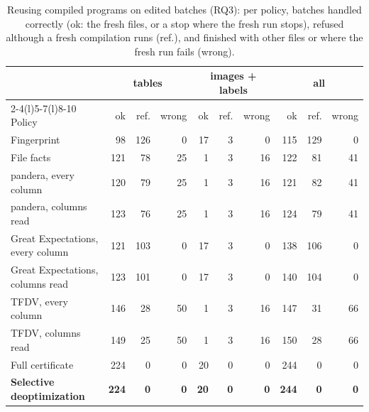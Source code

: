 \begin{table}[t]
\caption{Reusing compiled programs on edited batches (RQ3): per policy, batches handled correctly (ok: the fresh files, or a stop where the fresh run stops), refused although a fresh compilation runs (ref.), and finished with other files or where the fresh run fails (wrong).}
\label{tab:rq-edits}
\centering
\footnotesize
\begin{tabular}{@{}lrrrrrrrrr@{}}
\toprule
& \multicolumn{3}{c}{tables} & \multicolumn{3}{c}{images + labels} & \multicolumn{3}{c}{all} \\
\cmidrule(l){2-4}\cmidrule(l){5-7}\cmidrule(l){8-10}
Policy & ok & ref. & wrong & ok & ref. & wrong & ok & ref. & wrong \\
\midrule
Fingerprint & 98 & 126 & 0 & 17 & 3 & 0 & 115 & 129 & 0 \\
File facts & 121 & 78 & 25 & 1 & 3 & 16 & 122 & 81 & 41 \\
pandera, every column & 120 & 79 & 25 & 1 & 3 & 16 & 121 & 82 & 41 \\
pandera, columns read & 123 & 76 & 25 & 1 & 3 & 16 & 124 & 79 & 41 \\
Great Expectations, every column & 121 & 103 & 0 & 17 & 3 & 0 & 138 & 106 & 0 \\
Great Expectations, columns read & 123 & 101 & 0 & 17 & 3 & 0 & 140 & 104 & 0 \\
TFDV, every column & 146 & 28 & 50 & 1 & 3 & 16 & 147 & 31 & 66 \\
TFDV, columns read & 149 & 25 & 50 & 1 & 3 & 16 & 150 & 28 & 66 \\
Full certificate & 224 & 0 & 0 & 20 & 0 & 0 & 244 & 0 & 0 \\
\textbf{Selective deoptimization} & \textbf{224} & \textbf{0} & \textbf{0} & \textbf{20} & \textbf{0} & \textbf{0} & \textbf{244} & \textbf{0} & \textbf{0} \\
\bottomrule
\end{tabular}
\end{table}
